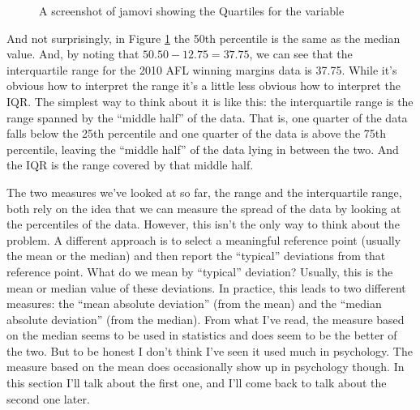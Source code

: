 \begin{figure}[htb]
\begin{center}
\caption{A screenshot of jamovi showing the Quartiles for the  variable }
\label{fig:aflsmall_margins_iqr}
\HR
\end{center}
\end{figure}

And not surprisingly, in Figure \ref{fig:aflsmall_margins_iqr} the 50th percentile is the same as the median value. And, by noting that $50.50 - 12.75 = 37.75$, we can see that the interquartile range for the 2010 AFL winning margins data is 37.75. While it's obvious how to interpret the range it's a little less obvious how to interpret the IQR. The simplest way to think about it is like this: the interquartile range is the range spanned by the ``middle half'' of the data. That is, one quarter of the data falls below the 25th percentile and one quarter of the data is above the 75th percentile, leaving the ``middle half'' of the data lying in between the two. And the IQR is the range covered by that middle half.


The two measures we've looked at so far, the range and the interquartile range, both rely on the idea that we can measure the spread of the data by looking at the percentiles of the data. However, this isn't the only way to think about the problem. A different approach is to select a meaningful reference point (usually the mean or the median) and then report the ``typical'' deviations from that reference point. What do we mean by ``typical'' deviation? Usually, this is the mean or median value of these deviations. In practice, this leads to two different measures: the ``mean absolute deviation'' (from the mean) and the ``median absolute deviation'' (from the median). From what I've read, the measure based on the median seems to be used in statistics and does seem to be the better of the two. But to be honest I don't think I've seen it used much in psychology. The measure based on the mean does occasionally show up in psychology though. In this section I'll talk about the first one, and I'll come back to talk about the second one later.

